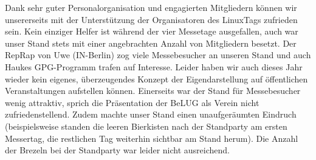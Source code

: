 \documentclass[11pt,a4paper,ngerman]{article}
\begin{document}
Dank sehr guter Personalorganisation und engagierten Mitgliedern können wir 
unsererseits mit der Unterstützung der Organisatoren des LinuxTags zufrieden 
sein. Kein einziger Helfer ist während der vier Messetage ausgefallen, auch war 
unser Stand stets mit einer angebrachten Anzahl von Mitgliedern besetzt. Der 
RepRap von Uwe (IN-Berlin) zog viele Messebesucher an unseren Stand und auch 
Haukes GPG-Programm trafen auf Interesse. Leider haben wir auch dieses Jahr 
wieder kein eigenes, überzeugendes Konzept der Eigendarstellung auf 
öffentlichen Veranstaltungen aufstellen können. Einerseits war der Stand für 
Messebesucher wenig attraktiv, sprich die Präsentation der BeLUG als Verein 
nicht zufriedenstellend. Zudem machte unser Stand einen unaufgeräumten Eindruch 
(beispielsweise standen die leeren Bierkisten nach der Standparty am ersten 
Messertag, die restlichen Tag weiterhin sichtbar am Stand herum). Die Anzahl 
der Brezeln bei der Standparty war leider nicht ausreichend.
  
  
\newpage{}


\newpage{}
\end{document}
